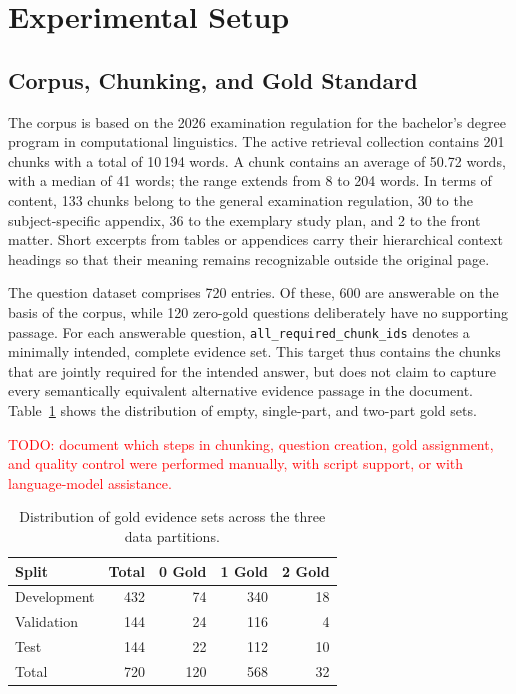 \documentclass[11pt]{article}
\begin{document}
\section{Experimental Setup}

\subsection{Corpus, Chunking, and Gold Standard}

The corpus is based on the 2026 examination regulation for the bachelor's degree program in computational linguistics. The active retrieval collection contains 201 chunks with a total of 10{\,}194 words. A chunk contains an average of 50.72 words, with a median of 41 words; the range extends from 8 to 204 words. In terms of content, 133 chunks belong to the general examination regulation, 30 to the subject-specific appendix, 36 to the exemplary study plan, and 2 to the front matter. Short excerpts from tables or appendices carry their hierarchical context headings so that their meaning remains recognizable outside the original page.

The question dataset comprises 720 entries. Of these, 600 are answerable on the basis of the corpus, while 120 zero-gold questions deliberately have no supporting passage. For each answerable question, \texttt{all\_required\_chunk\_ids} denotes a minimally intended, complete evidence set. This target thus contains the chunks that are jointly required for the intended answer, but does not claim to capture every semantically equivalent alternative evidence passage in the document. Table~\ref{tab:gold-distribution} shows the distribution of empty, single-part, and two-part gold sets.

\textcolor{red}{TODO: document which steps in chunking, question creation, gold assignment, and quality control were performed manually, with script support, or with language-model assistance.}

\begin{table}[t]
\centering
\small
\begin{tabular}{lrrrr}
\toprule
\textbf{Split} & \textbf{Total} & \textbf{0 Gold} & \textbf{1 Gold} & \textbf{2 Gold} \\
\midrule
Development & 432 & 74 & 340 & 18 \\
Validation & 144 & 24 & 116 & 4 \\
Test         & 144 & 22 & 112 & 10 \\
\midrule
Total       & 720 & 120 & 568 & 32 \\
\bottomrule
\end{tabular}
\caption{Distribution of gold evidence sets across the three data partitions.}
\label{tab:gold-distribution}
\end{table}
\end{document}
